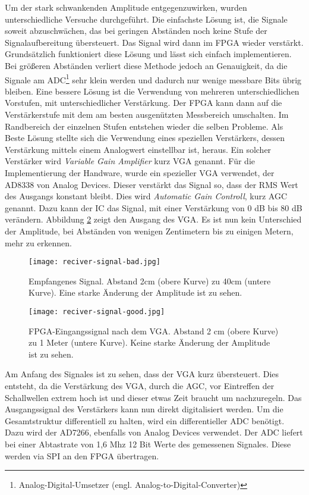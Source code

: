 Um der stark schwankenden Amplitude entgegenzuwirken, wurden unterschiedliche Versuche durchgeführt. Die einfachste Lösung ist, die Signale soweit abzuschwächen, das bei geringen Abständen noch keine Stufe der Signalaufbereitung übersteuert. Das Signal wird dann im FPGA wieder verstärkt. Grundsätzlich funktioniert diese Lösung und lässt sich einfach implementieren. Bei größeren Abständen verliert diese Methode jedoch an Genauigkeit, da die Signale am ADC\footnote{Analog-Digital-Umsetzer (engl. Analog-to-Digital-Converter)} sehr klein werden und dadurch nur wenige messbare Bits übrig bleiben. Eine bessere Lösung ist die Verwendung von mehreren unterschiedlichen Vorstufen, mit unterschiedlicher Verstärkung. Der FPGA kann dann auf die Verstärkerstufe mit dem am besten ausgenützten Messbereich umschalten. Im Randbereich der einzelnen Stufen entstehen wieder die selben Probleme. Als Beste Lösung stellte sich die Verwendung eines speziellen Verstärkers, dessen Verstärkung mittels einem Analogwert einstellbar ist, heraus. Ein solcher Verstärker wird \emph{Variable Gain Amplifier} kurz VGA genannt. Für die Implementierung der Handware, wurde ein spezieller VGA verwendet, der AD8338 von Analog Devices. Dieser verstärkt das Signal so, dass der RMS Wert des Ausgangs konstant bleibt. Dies wird \emph{Automatic Gain Controll}, kurz AGC genannt. Dazu kann der IC das Signal, mit einer Verstärkung von 0 dB bis 80 dB verändern. Abbildung \ref{fig:reciverSignalGood} zeigt den Ausgang des VGA. Es ist nun kein Unterschied der Amplitude, bei Abständen von wenigen Zentimetern bis zu einigen Metern, mehr zu erkennen.

\begin{figure}[H]
\centering
\texttt{[image: reciver-signal-bad.jpg]}
\caption{Empfangenes Signal. Abstand 2cm (obere Kurve) zu 40cm (untere Kurve). Eine starke Änderung der Amplitude ist zu sehen.}
\label{fig:reciverSignalBad}
\end{figure}

\begin{figure}[H]
\centering
\texttt{[image: reciver-signal-good.jpg]}
\caption{FPGA-Eingangssignal nach dem VGA. Abstand 2 cm (obere Kurve) zu 1 Meter (untere Kurve). Keine starke Änderung der Amplitude ist zu sehen.}
\label{fig:reciverSignalGood}
\end{figure}

Am Anfang des Signales ist zu sehen, dass der VGA kurz übersteuert. Dies entsteht, da die Verstärkung des VGA, durch die AGC, vor Eintreffen der Schallwellen extrem hoch ist und dieser etwas Zeit braucht um nachzuregeln. Das Ausgangssignal des Verstärkers kann nun direkt digitalisiert werden. Um die Gesamtstruktur differentiell zu halten, wird ein differentieller ADC benötigt. Dazu wird der AD7266, ebenfalls von Analog Devices verwendet. Der ADC liefert bei einer Abtastrate von 1,6 Mhz 12 Bit Werte des gemessenen Signales. Diese werden via SPI an den FPGA übertragen.
 
